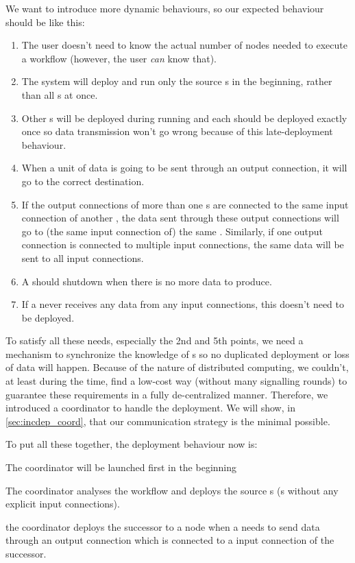 We want to introduce more dynamic behaviours, so our expected behaviour should be like this:
\begin{enumerate}
	\item The user doesn't need to know the actual number of nodes needed to execute a workflow (however, the user \emph{can} know that).
	\item The \dpy system will deploy and run only the source \tPEInst{}s in the beginning, rather than all \tPEInst{}s at once.
	\item Other \tPEInst{}s will be deployed during running and each \tPEInst should be deployed exactly once so data transmission won't go wrong because of this late-deployment behaviour.
	\item When a unit of data is going to be sent through an output connection, it will go to the correct destination.
	\item If the output connections of more than one \tPEInst{}s are connected to the same input connection of another \tPEInst, the data sent through these output connections will go to (the same input connection of) the same \tPEInst. Similarly, if one output connection is connected to multiple input connections, the same data will be sent to all input connections.
	\item A \tPEInst should shutdown when there is no more data to produce.
	\item If a \tPEInst never receives any data from any input connections, this \tPEInst doesn't need to be deployed.
\end{enumerate}

To satisfy all these needs, especially the 2nd and 5th points, we need a mechanism to synchronize the knowledge of \tPEInst{}s so no duplicated deployment or loss of data will happen. Because of the nature of distributed computing, we couldn't, at least during the time, find a low-cost way (\ie without many signalling rounds) to guarantee these requirements in a fully de-centralized manner. Therefore, we introduced a coordinator to handle the deployment. We will show, in \ref{sec:incdep_coord}, that our communication strategy is the minimal possible.

To put all these together, the deployment behaviour now is:
\begin{enumerate*}
	\item The coordinator will be launched first in the beginning
	\item The coordinator analyses the workflow and deploys the source \tPEInst{}s (\ie \tPEInst{}s without any explicit input connections).
	\item the coordinator deploys the successor \tPEInst to a node when a \tPEInst needs to send data through an output connection which is connected to a input connection of the successor.
\end{enumerate*}

